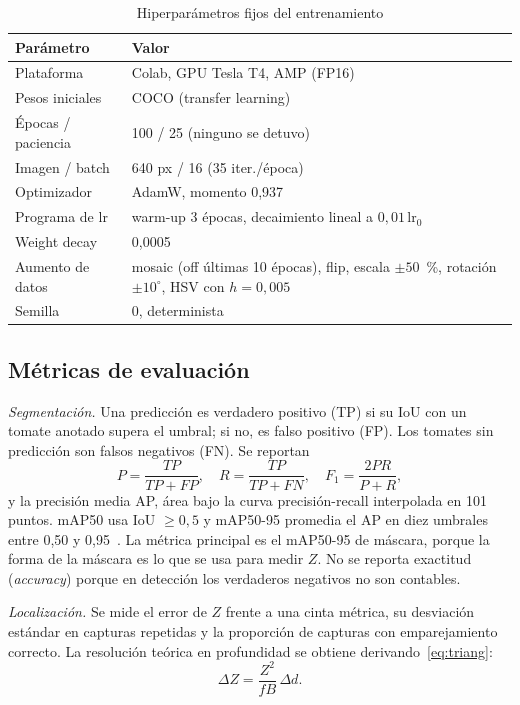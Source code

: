 \documentclass[conference]{IEEEtran}
\begin{document}
\begin{table}[t]
\caption{Hiperparámetros fijos del entrenamiento}
\label{tab:fijos}
\centering
\begin{tabular}{lp{4.6cm}}
\toprule
Parámetro & Valor \\
\midrule
Plataforma & Colab, GPU Tesla T4, AMP (FP16) \\
Pesos iniciales & COCO (transfer learning) \\
Épocas / paciencia & 100 / 25 (ninguno se detuvo) \\
Imagen / batch & 640 px / 16 (35 iter./época) \\
Optimizador & AdamW, momento 0,937 \\
Programa de lr & warm-up 3 épocas, decaimiento lineal a $0{,}01\,\mathrm{lr}_0$ \\
Weight decay & 0,0005 \\
Aumento de datos & mosaic (off últimas 10 épocas), flip, escala $\pm50$~\%, rotación $\pm10^\circ$, HSV con $h=0{,}005$ \\
Semilla & 0, determinista \\
\bottomrule
\end{tabular}
\end{table}

\subsection{Métricas de evaluación}
\emph{Segmentación.} Una predicción es verdadero positivo (TP) si su IoU con un tomate anotado supera el umbral; si no, es falso positivo (FP). Los tomates sin predicción son falsos negativos (FN). Se reportan
\begin{equation}
P=\frac{TP}{TP+FP},\quad R=\frac{TP}{TP+FN},\quad F_1=\frac{2PR}{P+R},
\end{equation}
y la precisión media AP, área bajo la curva precisión-recall interpolada en 101 puntos. mAP50 usa IoU $\ge0{,}5$ y mAP50-95 promedia el AP en diez umbrales entre 0,50 y 0,95~\cite{lin2014}. La métrica principal es el mAP50-95 de máscara, porque la forma de la máscara es lo que se usa para medir $Z$. No se reporta exactitud (\emph{accuracy}) porque en detección los verdaderos negativos no son contables.

\emph{Localización.} Se mide el error de $Z$ frente a una cinta métrica, su desviación estándar en capturas repetidas y la proporción de capturas con emparejamiento correcto. La resolución teórica en profundidad se obtiene derivando~\eqref{eq:triang}:
\begin{equation}
\Delta Z=\frac{Z^2}{fB}\,\Delta d.
\label{eq:resolucion}
\end{equation}
\end{document}
